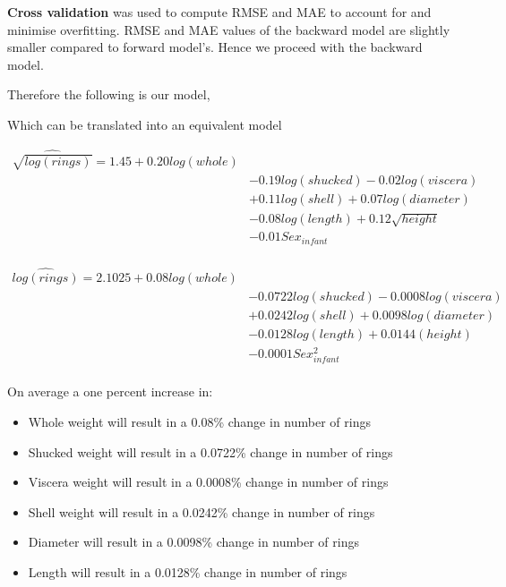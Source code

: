 \documentclass[letterpaper,9pt,twocolumn,twoside,]{pinp}
\providecommand{\tightlist}{%
  \setlength{\itemsep}{0pt}\setlength{\parskip}{0pt}}
\begin{document}
\textbf{Cross validation} was used to compute RMSE and MAE to account
for and minimise overfitting. RMSE and MAE values of the backward model
are slightly smaller compared to forward model's. Hence we proceed with
the backward model.

Therefore the following is our model,

Which can be translated into an equivalent model

\begin{equation}
  \begin{aligned}
\widehat{\sqrt{log(rings)}} = 1.45 + 0.20 log(whole)\\
       &- 0.19 log(shucked) - 0.02 log(viscera) \\
       &+ 0.11 log(shell) + 0.07 log(diameter)\\
       &- 0.08 log(length) + 0.12 \sqrt{height}\\
       &- 0.01 Sex_{infant}\\
  \end{aligned}
\end{equation}

\begin{equation}
  \begin{aligned}
\widehat{log(rings)} = 2.1025 + 0.08log(whole)\\
       &- 0.0722 log(shucked) - 0.0008log(viscera) \\
       &+ 0.0242 log(shell) + 0.0098log(diameter)\\
       &- 0.0128 log(length) + 0.0144(height)\\
       &- 0.0001 Sex_{infant}^2\\
  \end{aligned}
\end{equation}

On average a one percent increase in:

\begin{itemize}
\tightlist
\item
  Whole weight will result in a 0.08\% change in number of rings
\item
  Shucked weight will result in a 0.0722\% change in number of rings
\item
  Viscera weight will result in a 0.0008\% change in number of rings
\item
  Shell weight will result in a 0.0242\% change in number of rings
\item
  Diameter will result in a 0.0098\% change in number of rings
\item
  Length will result in a 0.0128\% change in number of rings
\end{itemize}
\end{document}
